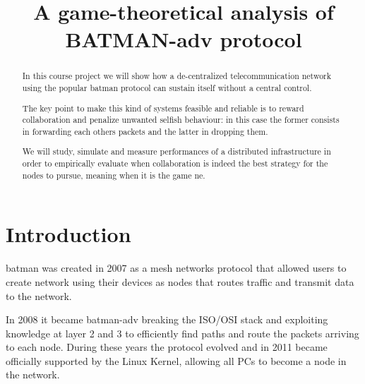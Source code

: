 \documentclass[conference]{IEEEtran}
\begin{document}
\title{A game-theoretical analysis of BATMAN-adv protocol}

\author{
\and
{}
}

\maketitle

\begin{abstract}
  In this course project we will show how a de-centralized telecommunication network using the popular \gls{batman} protocol can sustain itself without a central control.

  The key point to make this kind of systems feasible and reliable is to reward collaboration and penalize unwanted selfish behaviour: in this case the former consists in forwarding each others packets and the latter in dropping them.

  We will study, simulate and measure performances of a distributed infrastructure in order to empirically evaluate when collaboration is indeed the best strategy for the nodes to pursue, meaning when it is the game \gls{ne}.
\end{abstract}

\section{Introduction}


\gls{batman} was created in 2007 as a mesh networks protocol that allowed users to create network using their devices as nodes that routes traffic and transmit data to the network.

In 2008 it became \gls{batman}-adv breaking the ISO/OSI stack and exploiting knowledge at layer 2 and 3 to efficiently find paths and route the packets arriving to each node. During these years the protocol evolved and in 2011 became officially supported by the Linux Kernel, allowing all PCs to become a node in the network.
\end{document}

